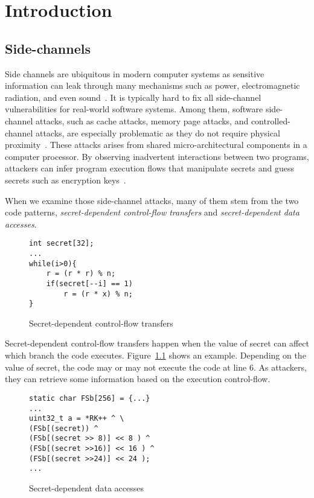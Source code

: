 
\chapter{Introduction} \label{chapter1}
\section{Side-channels}
Side channels are ubiquitous in modern computer systems as sensitive
information can leak through many mechanisms such as power,
electromagnetic radiation, and even sound~\cite{agrawal2002side,kar20178,chari1999towards,217605,genkin2014rsa}.
It is typically hard to fix all side-channel vulnerabilities for real-world software systems. Among them, software side-channel attacks, such as cache attacks, memory page attacks, and controlled-channel attacks, are especially problematic as they do not require physical proximity~\cite{7163052,217543,217589,lee2017inferring,191010,liu2015last}. These attacks arises from shared micro-architectural components in a computer processor. By observing inadvertent interactions between two programs, attackers can infer program execution flows that manipulate secrets and guess secrets such as encryption keys~\cite{Osvik2006,Gullasch:2011:CGB:2006077.2006784,203878,10.1007/978-3-540-45238-6_6}.



When we examine those side-channel attacks, many of them stem from the two code patterns, \emph{secret-dependent control-flow transfers} and \emph{secret-dependent data accesses}.
\begin{figure}[h]
    \begin{lstlisting}[xleftmargin=.32\textwidth, xrightmargin=.32\textwidth]
int secret[32];
...
while(i>0){
    r = (r * r) % n;
    if(secret[--i] == 1)
        r = (r * x) % n;   
}
\end{lstlisting}
    \caption{Secret-dependent control-flow transfers}
    \label{fig:secret:cf}
\end{figure}

Secret-dependent control-flow transfers happen when the value of secret can affect which branch the code executes. Figure~\ref{fig:secret:cf} shows an example. Depending on the value of \textsf{secret}, the code may or may not execute the code at line 6. As attackers, they can retrieve some information based on the execution control-flow.

\begin{figure}[h]
    \begin{lstlisting}[xleftmargin=.32\textwidth, xrightmargin=.32\textwidth]
static char FSb[256] = {...}
... 
uint32_t a = *RK++ ^ \ 
(FSb[(secret)) ^
(FSb[(secret >> 8)] << 8 ) ^
(FSb[(secret >>16)] << 16 ) ^
(FSb[(secret >>24)] << 24 );
...
\end{lstlisting}
    \caption{Secret-dependent data accesses}
    \label{fig:secret:da}
\end{figure}

